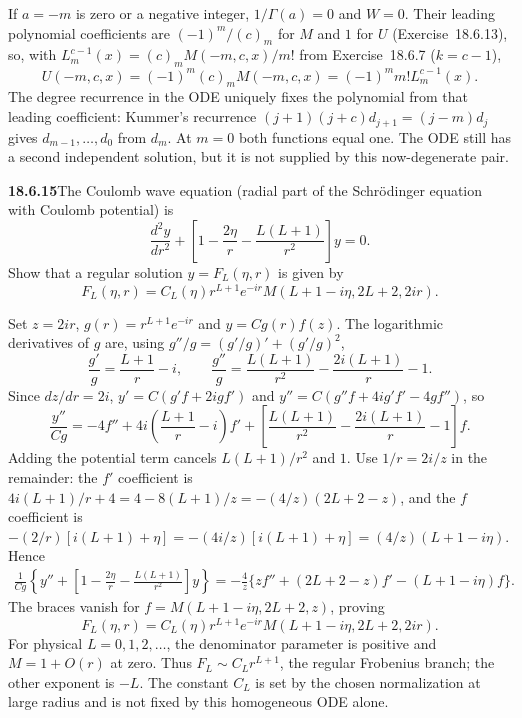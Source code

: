 If $a=-m$ is zero or a negative integer, $1/\Gamma(a)=0$ and
$W=0$.    Their leading polynomial
coefficients are $(-1)^m/(c)_m$ for $M$ and $1$ for $U$
(Exercise~18.6.13), so, with $L_m^{c-1}(x)=(c)_mM(-m,c,x)/m!$
from Exercise~18.6.7 ($k=c-1$),
\[
\boxed{U(-m,c,x)=(-1)^m(c)_mM(-m,c,x)
                    =(-1)^mm!L_m^{c-1}(x)}.
\]
The degree recurrence in the ODE uniquely fixes the polynomial
from that leading coefficient: Kummer's recurrence
$(j+1)(j+c)d_{j+1}=(j-m)d_j$ gives $d_{m-1},\ldots,d_0$ from $d_m$.
At $m=0$ both functions equal one.  The ODE still has a second
independent solution, but it is not supplied by this now-degenerate
pair.

\par\bigskip
\noindent\textbf{18.6.15}\quad The Coulomb wave equation (radial
part of the Schr\"odinger equation with Coulomb potential) is
\[
\frac{d^{2}y}{dr^{2}}
+\left[1-\frac{2\eta}{r}-\frac{L(L+1)}{r^{2}}\right]y=0.
\]
Show that a regular solution $y=F_{L}(\eta,r)$ is given by
\[
F_{L}(\eta,r)=C_{L}(\eta)r^{L+1}e^{-ir}M(L+1-i\eta,2L+2,2ir).
\]
\par\nobreak
\solution
Set $z=2ir$, $g(r)=r^{L+1}e^{-ir}$ and $y=Cg(r)f(z)$.
The logarithmic derivatives of $g$ are, using
$g''/g=(g'/g)'+(g'/g)^2$,
\[
\frac{g'}g=\frac{L+1}{r}-i,\qquad
\frac{g''}g=\frac{L(L+1)}{r^2}-\frac{2i(L+1)}r-1.
\]
Since $dz/dr=2i$, $y'=C(g'f+2igf')$ and
$y''=C(g''f+4ig'f'-4gf'')$, so
\[
\frac{y''}{Cg}=-4f''+4i\left(\frac{L+1}r-i\right)f'
 +\left[\frac{L(L+1)}{r^2}-\frac{2i(L+1)}r-1\right]f.
\]
Adding the potential term cancels $L(L+1)/r^2$ and $1$.
Use $1/r=2i/z$ in the remainder: the $f'$ coefficient is
$4i(L+1)/r+4=4-8(L+1)/z=-(4/z)(2L+2-z)$, and the $f$
coefficient is
$-(2/r)[i(L+1)+\eta]=-(4i/z)[i(L+1)+\eta]=(4/z)(L+1-i\eta)$.
Hence
\begin{align*}
\frac1{Cg}\left\{y''+
  \left[1-\frac{2\eta}r-\frac{L(L+1)}{r^2}\right]y\right\}
 =-\frac4z\{zf''+(2L+2-z)f'-(L+1-i\eta)f\}.
\end{align*}
The braces vanish for $f=M(L+1-i\eta,2L+2,z)$, proving
\[
\boxed{F_L(\eta,r)=C_L(\eta)r^{L+1}e^{-ir}
                  M(L+1-i\eta,2L+2,2ir)}.
\]
For physical $L=0,1,2,\ldots$, the denominator parameter is
positive and $M=1+O(r)$ at zero.  Thus $F_L\sim C_Lr^{L+1}$,
the regular Frobenius branch; the other exponent is $-L$.
The constant $C_L$ is set by the chosen normalization at large
radius and is not fixed by this homogeneous ODE alone.

